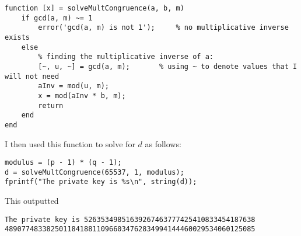 \documentclass[11pt]{article}
\begin{document}
\begin{Verbatim}[xleftmargin=0.5in]
function [x] = solveMultCongruence(a, b, m)
    if gcd(a, m) ~= 1
        error('gcd(a, m) is not 1');     % no multiplicative inverse exists
    else
        % finding the multiplicative inverse of a:
        [~, u, ~] = gcd(a, m);       % using ~ to denote values that I will not need
        aInv = mod(u, m);
        x = mod(aInv * b, m);
        return
    end
end
\end{Verbatim}
I then used this function to solve for $d$ as follows:
\begin{Verbatim}[xleftmargin=0.5in]
modulus = (p - 1) * (q - 1);
d = solveMultCongruence(65537, 1, modulus);
fprintf("The private key is %s\n", string(d)); 
\end{Verbatim}
This outputted
\begin{Verbatim}[xleftmargin=0.5in]
The private key is 52635349851639267463777425410833454187638
489077483382501184188110966034762834994144460029534060125085
\end{Verbatim}
\end{document}
